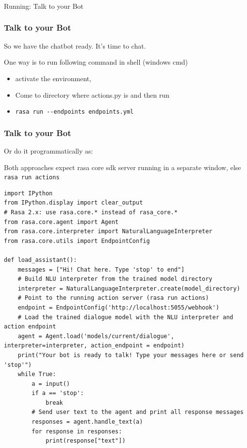 \begin{frame}[fragile]\frametitle{}
\begin{center}
{\Large Running: Talk to your Bot}

\end{center}
\end{frame}



 \begin{frame}[fragile]\frametitle{Talk to your Bot}

So we have the chatbot ready. It's time to chat.

One way is to run following command in shell (windows cmd) 
\begin{itemize}
\item activate the environment,
\item Come to directory where actions.py is and then run
\item \lstinline|rasa run --endpoints endpoints.yml|
\end{itemize}

\end{frame}

 \begin{frame}[fragile]\frametitle{Talk to your Bot}

Or do it programmatically as:

Both approaches expect rasa core sdk server running in a separate window, else 
\lstinline|rasa run actions|


\begin{lstlisting}
import IPython
from IPython.display import clear_output
# Rasa 2.x: use rasa.core.* instead of rasa_core.*
from rasa.core.agent import Agent
from rasa.core.interpreter import NaturalLanguageInterpreter
from rasa.core.utils import EndpointConfig

def load_assistant():
    messages = ["Hi! Chat here. Type 'stop' to end"]
    # Build NLU interpreter from the trained model directory
    interpreter = NaturalLanguageInterpreter.create(model_directory)
    # Point to the running action server (rasa run actions)
    endpoint = EndpointConfig('http://localhost:5055/webhook')
    # Load the trained dialogue model with the NLU interpreter and action endpoint
    agent = Agent.load('models/current/dialogue', interpreter=interpreter, action_endpoint = endpoint)
    print("Your bot is ready to talk! Type your messages here or send 'stop'")
    while True:
        a = input()
        if a == 'stop':
            break
        # Send user text to the agent and print all response messages
        responses = agent.handle_text(a)
        for response in responses:
            print(response["text"])
\end{lstlisting}

\end{frame}

